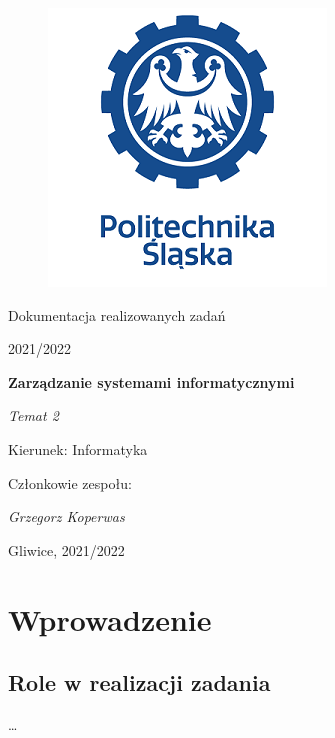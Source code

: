 \documentclass[12pt,a4paper]{article}
\begin{document}
\clearpage
\begin{figure}[h]
\centering
\includegraphics{media/ps-logo.png}
\end{figure}
\hspace{3cm}
\begin{center}Dokumentacja realizowanych zadań\end{center}
\begin{center}2021/2022\end{center}
\hspace{3cm}
\begin{center}\large\textbf{Zarządzanie systemami informatycznymi}\end{center}
\begin{center}\large\textit{Temat 2}\end{center}

\hspace{7cm}
\begin{flushright}Kierunek: Informatyka
\end{flushright}
\begin{flushright}Członkowie zespołu:
\par
\textit{Grzegorz Koperwas}
\end{flushright}
\vfill
\begin{center}Gliwice, 2021/2022\end{center}

\newpage
{}
\tableofcontents

\newpage
\section{Wprowadzenie}

\subsection{Role w realizacji zadania}
\ldots 
\end{document}
